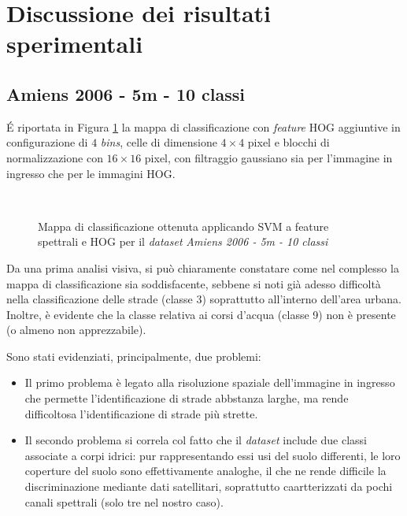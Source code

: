 \clearpage

\section{Discussione dei risultati sperimentali}

\subsection{Amiens 2006 - 5m - 10 classi}

\'E riportata in Figura \ref{fig:ClassMap_Amiens2006_5m} la mappa di
classificazione con \emph{feature} HOG aggiuntive in configurazione di
$4$ \emph{bins}, celle di dimensione $4\times4$ pixel e blocchi di
normalizzazione con $16\times16$ pixel, con filtraggio gaussiano sia
per l'immagine in ingresso che per le immagini HOG.

\begin{figure}[!ht]
\center
{}
\\

\caption{Mappa di classificazione ottenuta applicando SVM a feature spettrali e HOG per il \emph{dataset} \emph{Amiens 2006 - 5m - 10 classi}}

\label{fig:ClassMap_Amiens2006_5m}

\end{figure}
\clearpage
Da una prima analisi visiva, si può chiaramente constatare come nel
complesso la mappa di classificazione sia soddisfacente, sebbene si
noti già adesso difficoltà nella classificazione delle strade (classe
3) soprattutto all'interno dell'area urbana. Inoltre, è evidente che
la classe relativa ai corsi d'acqua (classe 9) non è presente (o
almeno non apprezzabile).

Sono stati evidenziati, principalmente, due problemi:
\begin{itemize}
\item Il primo problema è legato alla risoluzione spaziale dell'immagine in
ingresso che permette l'identificazione di strade abbstanza larghe, ma
rende difficoltosa l'identificazione di strade più strette.
\item Il secondo problema si correla col fatto che il \emph{dataset} include due classi
associate a corpi idrici: pur rappresentando essi usi del suolo
differenti, le loro coperture del suolo sono effettivamente analoghe,
il che ne rende difficile la discriminazione mediante dati
satellitari, soprattutto caartterizzati da pochi canali spettrali
(solo tre nel nostro caso).
\end{itemize}

